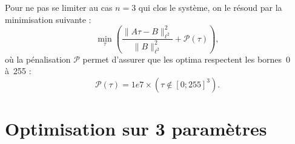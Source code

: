 \documentclass[main.tex]{subfiles}
\newlength{\firstcolwidth} %
\begin{document}
Pour ne pas se limiter au cas $n=3$ qui clos le système, on le résoud par la minimisation suivante :
\begin{equation}\label{eq:min_optim_grey}
\min_{\tau} \left( \dfrac{\| A\tau - B \|^2_{\ell^2}}{\|B\|^2_{\ell^2}} + \mathcal{P}(\tau) \right),
\end{equation}
où la pénalisation $\mathcal{P}$ permet d'assurer que les optima respectent les bornes~0 à~255 :
\begin{equation}
\label{eq:penalisation_creneau}
\mathcal{P}(\tau) = 1e7 \times ( \tau \notin  [0;255]^3 ).
\end{equation}

\section{Optimisation sur 3 paramètres}
\end{document}

